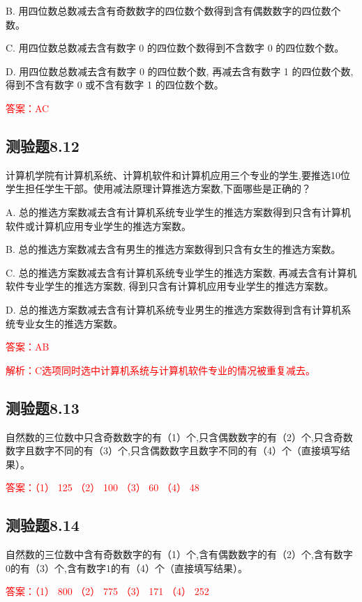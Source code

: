 \documentclass[UTF8, heading=true]{ctexart}
\begin{document}
B. 用四位数总数减去含有奇数数字的四位数个数得到含有偶数数字的四位数个数。

C. 用四位数总数减去含有数字 0 的四位数个数得到不含数字 0 的四位数个数。

D. 用四位数总数减去含有数字 0 的四位数个数, 再减去含有数字 1 的四位数个数, 得到不含有数字 0 或不含有数字 1 的四位数个数。

\textcolor{red}{答案：AC}

\subsection{测验题8.12}

计算机学院有计算机系统、计算机软件和计算机应用三个专业的学生,要推选10位学生担任学生干部。使用减法原理计算推选方案数,下面哪些是正确的？

A. 总的推选方案数减去含有计算机系统专业学生的推选方案数得到只含有计算机软件或计算机应用专业学生的推选方案数。

B. 总的推选方案数减去含有男生的推选方案数得到只含有女生的推选方案数。

C. 总的推选方案数减去含有计算机系统专业学生的推选方案数, 再减去含有计算机软件专业学生的推选方案数, 得到只含有计算机应用专业学生的推选方案数。

D. 总的推选方案数减去含有计算机系统专业男生的推选方案数得到含有计算机系统专业女生的推选方案数。

\textcolor{red}{答案：AB}

\textcolor{red}{解析：C选项同时选中计算机系统与计算机软件专业的情况被重复减去。}

\subsection{测验题8.13}

自然数的三位数中只含奇数数字的有（1）个,只含偶数数字的有（2）个,只含奇数数字且数字不同的有（3）个,只含偶数数字且数字不同的有（4）个（直接填写结果）。

\textcolor{red}{答案：（1） 125 （2） 100 （3） 60 （4） 48}


\subsection{测验题8.14}
自然数的三位数中含有奇数数字的有（1）个,含有偶数数字的有（2）个,含有数字0的有（3）个,含有数字1的有（4）个（直接填写结果）。

\textcolor{red}{答案：（1） 800 （2） 775 （3） 171 （4） 252}
\end{document}
